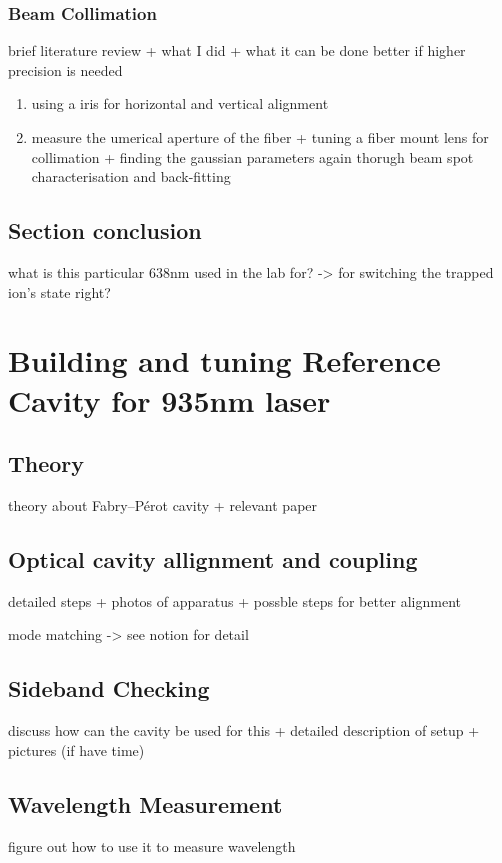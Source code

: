 \documentclass[11pt,A4Paper]{article}
\begin{document}
\subsubsection{Beam Collimation}
brief literature review + what I did + what it can be done better if higher precision is needed
\begin{enumerate}
    \item using a iris for horizontal and vertical alignment
    \item measure the umerical aperture of the fiber + tuning a fiber mount lens for collimation + finding the gaussian parameters again thorugh beam spot characterisation and back-fitting
\end{enumerate}




\subsection{Section conclusion}
what is this particular 638nm used in the lab for? -> for switching the trapped ion's state right? 


\section{Building and tuning Reference Cavity for 935nm laser}
\subsection{Theory}
theory about Fabry–Pérot cavity + relevant paper 




\subsection{Optical cavity allignment and coupling}
detailed steps + photos of apparatus + possble steps for better alignment

mode matching -> see notion for detail

\subsection{Sideband Checking}
discuss how can the cavity be used for this + detailed description of setup + pictures (if have time)



\subsection{Wavelength Measurement}
figure out how to use it to measure wavelength
\end{document}
